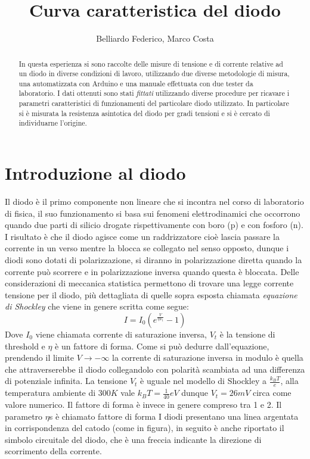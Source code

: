 \documentclass[a4paper,10pt]{article}
\title{Curva caratteristica del diodo}
\author{Belliardo Federico, Marco Costa}
\begin{document}
\maketitle

\begin{abstract}
In questa esperienza si sono raccolte delle misure di tensione e di corrente relative ad un diodo in diverse condizioni di lavoro, utilizzando due diverse metodologie di misura, 
una automatizzata con Arduino e una manuale effettuata con due tester da laboratorio. I dati ottenuti sono stati \emph{fittati} utilizzando diverse procedure per ricavare i parametri caratteristici
di funzionamenti del particolare diodo utilizzato. In particolare si è misurata la resistenza asintotica del diodo per gradi tensioni e si è cercato di individuarne l'origine.
\end{abstract}

\section{Introduzione al diodo}
Il diodo è il primo componente non lineare che si incontra nel corso di laboratorio di fisica, il suo funzionamento si basa sui fenomeni elettrodinamici che occorrono quando due 
parti di silicio drogate rispettivamente con boro (p) e con fosforo (n). I risultato è che il diodo agisce come un raddrizzatore cioè lascia passare la corrente in un verso mentre la blocca
se collegato nel senso opposto, dunque i diodi sono dotati di polarizzazione, si diranno in polarizzazione diretta quando la corrente può scorrere e in polarizzazione inversa quando questa è bloccata. 
Delle considerazioni di meccanica statistica permettono di trovare una legge corrente tensione per il diodo, più dettagliata di quelle sopra esposta chiamata \emph{equazione di Shockley} che viene
in genere scritta come segue: 
\begin{equation}
 I = I_0 (e^{\frac{V}{\eta V_t}}-1)
\end{equation}
Dove $I_0$ viene chiamata corrente di saturazione inversa, $V_t$ è la tensione di threshold e $\eta$ è un fattore di forma.
Come si può dedurre dall'equazione, prendendo il limite $V \longrightarrow -\infty$ la corrente di saturazione inversa in modulo è quella che attraverserebbe il diodo 
collegandolo con polarità scambiata ad una differenza di potenziale infinita.
La tensione $V_t$ è uguale nel modello di Shockley a $\frac{k_B T}{e}$, alla temperatura ambiente di $300 K$ vale $k_B T = \frac{1}{40} eV$ dunque $V_t = 26 mV$ circa come valore numerico.
Il fattore di forma è invece in genere compreso tra 1 e 2.
Il parametro $\eta$s è chiamato fattore di forma 
I diodi presentano una linea argentata in corrispondenza del catodo (come in figura), in seguito è anche riportato il simbolo circuitale del diodo, che è una freccia indicante 
la direzione di scorrimento della corrente.
\end{document}
